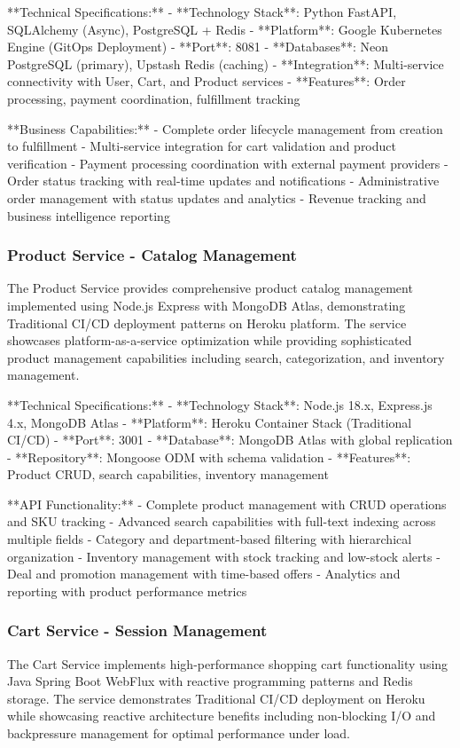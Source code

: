 **Technical Specifications:**
- **Technology Stack**: Python FastAPI, SQLAlchemy (Async), PostgreSQL + Redis
- **Platform**: Google Kubernetes Engine (GitOps Deployment)
- **Port**: 8081
- **Databases**: Neon PostgreSQL (primary), Upstash Redis (caching)
- **Integration**: Multi-service connectivity with User, Cart, and Product services
- **Features**: Order processing, payment coordination, fulfillment tracking

**Business Capabilities:**
- Complete order lifecycle management from creation to fulfillment
- Multi-service integration for cart validation and product verification
- Payment processing coordination with external payment providers
- Order status tracking with real-time updates and notifications
- Administrative order management with status updates and analytics
- Revenue tracking and business intelligence reporting

\subsubsection{Product Service - Catalog Management}
The Product Service provides comprehensive product catalog management implemented using Node.js Express with MongoDB Atlas, demonstrating Traditional CI/CD deployment patterns on Heroku platform. The service showcases platform-as-a-service optimization while providing sophisticated product management capabilities including search, categorization, and inventory management.

**Technical Specifications:**
- **Technology Stack**: Node.js 18.x, Express.js 4.x, MongoDB Atlas
- **Platform**: Heroku Container Stack (Traditional CI/CD)
- **Port**: 3001
- **Database**: MongoDB Atlas with global replication
- **Repository**: Mongoose ODM with schema validation
- **Features**: Product CRUD, search capabilities, inventory management

**API Functionality:**
- Complete product management with CRUD operations and SKU tracking
- Advanced search capabilities with full-text indexing across multiple fields
- Category and department-based filtering with hierarchical organization
- Inventory management with stock tracking and low-stock alerts
- Deal and promotion management with time-based offers
- Analytics and reporting with product performance metrics

\subsubsection{Cart Service - Session Management}
The Cart Service implements high-performance shopping cart functionality using Java Spring Boot WebFlux with reactive programming patterns and Redis storage. The service demonstrates Traditional CI/CD deployment on Heroku while showcasing reactive architecture benefits including non-blocking I/O and backpressure management for optimal performance under load.

